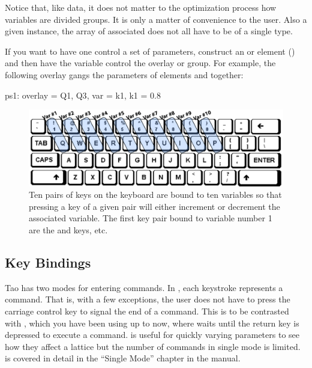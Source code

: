 \documentclass{hitec}     %
\begin{document}
{Notice that, like data, it does not matter to the optimization process how variables are divided
groups. It is only a matter of convenience to the user. Also a given  instance, the array
of associated  does not all have to be of a single type.

If you want to have one \tao {} control a set of parameters, construct an  or
 element () and then have the \tao variable control the overlay or
group. For example, the following overlay gangs the  parameters of elements  and
 together:
\begin{code}
ps1: overlay = {Q1, Q3}, var = {k1}, k1 = 0.8
\end{code}

\begin{figure}[b]
  \centering
  \includegraphics[width=5in]{keyboard.pdf}
  \caption
{Ten pairs of keys on the keyboard are bound to ten variables so that pressing a key of a given pair
will either increment or decrement the associated variable. The first key pair bound to variable
number 1 are the  and  keys, etc.}
  \label{f:keyboard}
\end{figure}

\subsection{Key Bindings}
\label{s:key.bound}

Tao has two modes for entering commands. In , each keystroke represents a command.
That is, with a few exceptions, the user does not have to press the carriage control key to signal
the end of a command. This is to be contrasted with , which you have been using up to
now, where \tao waits until the return key is depressed to execute a command.  is
useful for quickly varying parameters to see how they affect a lattice but the number of commands in
single mode is limited.  is covered in detail in the ``Single Mode'' chapter in the
\tao manual.

}
\end{document}
